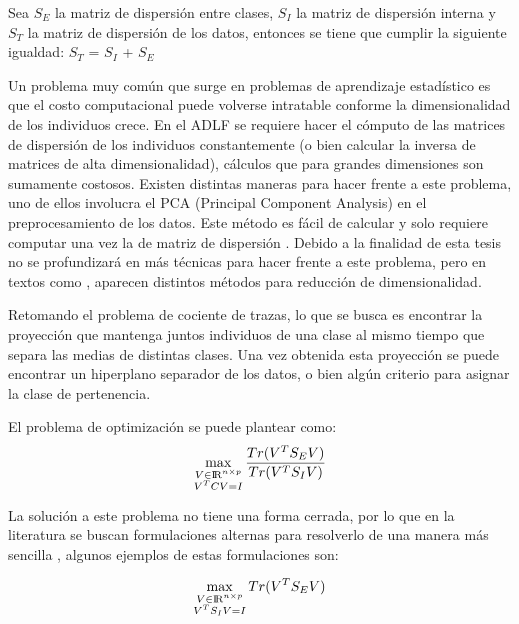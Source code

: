 \begin{proposition} \label{lemma2.1}
Sea $S_E$ la matriz de dispersión entre clases, $S_I$ la matriz de dispersión interna y $S_T$ la matriz de dispersión de los datos, entonces se tiene que cumplir la siguiente igualdad: $S_T$ = $S_I$ + $S_E$
\end{proposition}

Un problema muy común que surge en problemas de aprendizaje estadístico es que el costo computacional puede volverse intratable conforme la dimensionalidad de los individuos crece. En el ADLF se requiere hacer el cómputo de las matrices de dispersión de los individuos constantemente (o bien calcular la inversa de matrices de alta dimensionalidad), cálculos que para grandes dimensiones son sumamente costosos. Existen distintas maneras para hacer frente a este problema, uno de ellos involucra el PCA (Principal Component Analysis) en el preprocesamiento de los datos. Este método es fácil de calcular y solo requiere computar una vez la de matriz de dispersión \cite{ngo2012trace}. Debido a la finalidad de esta tesis no se profundizará en más técnicas para hacer frente a este problema, pero en textos como \cite{hastie2009elements}, \cite{duda2012pattern} aparecen distintos métodos para reducción de dimensionalidad.

Retomando el problema de cociente de trazas, lo que se busca es encontrar la proyección que mantenga juntos individuos de una clase al mismo tiempo que separa las medias de distintas clases. Una vez obtenida esta proyección se puede encontrar un hiperplano separador de los datos, o bien algún criterio para asignar la clase de pertenencia. 

\pagebreak
El problema de optimización se puede plantear como:
\begin{equation}\label{eq:2.5}
	\max_{\substack{V \in {\rm I\!R}^{n \times p} \\ V^TC V = I}} \frac{Tr(V^T S_E V)}{Tr(V^T S_I V)} 	
\end{equation}

 La solución a este problema no tiene una forma cerrada, por lo que en la literatura se buscan formulaciones alternas para resolverlo de una manera más sencilla \cite{wang2007trace} \cite{fukunaga2013introduction}, algunos ejemplos de estas formulaciones son:

\begin{equation}\label{eq:2.6}
	\max_{\substack{V \in {\rm I\!R}^{n \times p} \\ V^T S_I V = I}} Tr(V^T S_E V)
\end{equation}

